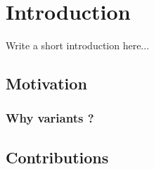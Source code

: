 \chapter{Introduction}

\newcommand{\rqone}{RQ1. To what extent can we generate program variants for \wasm?}
\newcommand{\rqtwo}{RQ2. To what extent are the generated variants dynamically different?}
\newcommand{\rqthree}{RQ3. To what extent can the artificial variants be used to enforce security on Edge-Cloud platforms?}

Write a short introduction here...


\section{Motivation}

\subsection{Why variants ?}

\section{Contributions}